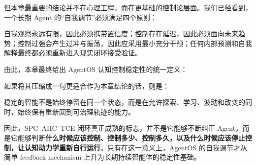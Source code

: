 但本章最重要的结论并不在心理工程，而在更基础的控制论层面。我们已经看到，一个长期 Agent 的“自我调节”必须满足四个原则：
\begin{statementbox}
\centering
{}
\end{statementbox}
自我观察永远有限，因此必须携带置信度；控制存在延迟，因此必须面向未来趋势；控制过强会产生过冲与振荡，因此应采用最小充分干预；任何内部预测和自我解释最终都必须重新进入现实闭环接受验证。

由此，本章最终给出 AgentOS 认知控制稳定性的统一定义：

\begin{statementbox}
\centering
{}
\end{statementbox}

如果将其压缩成一句更适合作为本章结论的话，则是：

\begin{conclusion}
稳定的智能不是始终停留在同一个状态，而是在允许探索、学习、波动和改变的同时，始终保有重新回到可治理轨迹的能力。
\end{conclusion}

因此，SPC--AHC--TCE 闭环真正成熟的标志，并不是它能够不断纠正 Agent，而是它能够判断\textbf{什么时候应该控制、控制多少、控制多久，以及什么时候应该停止控制，让认知动力学重新自行运行}。只有在这一意义上，AgentOS 的自我调节才从简单 feedback mechanism 上升为长期持续智能体的稳定性基础。
